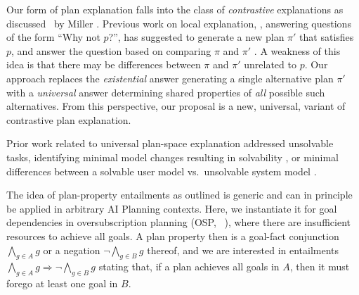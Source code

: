 Our form of plan explanation falls into the class of
\emph{contrastive} explanations as discussed \eg\ by Miller
. Previous work on local explanation, \ie,
answering questions of the form ``Why not $p$?'', has suggested to
generate a new plan $\pi'$ that satisfies $p$, and answer the question
based on comparing $\pi$ and $\pi'$
\cite{smith:aaai-12,fox:etal:ijcai-ws-17}. A weakness of this idea is
that there may be differences between $\pi$ and $\pi'$ unrelated to
$p$. Our approach replaces the \emph{existential} answer generating a
single alternative plan $\pi'$ with a \emph{universal} answer
determining shared properties of \emph{all} possible such
alternatives. From this perspective, our proposal is a new, universal,
variant of contrastive plan explanation.

Prior work related to universal plan-space explanation addressed
unsolvable tasks, identifying minimal model changes resulting in
solvability \cite{goebelbecker:etal:icaps-10}, or minimal differences
between a solvable user model vs.\ unsolvable system model
\cite{sreedharan:etal:ijcai-19}.
%
%

%


The idea of plan-property entailments as outlined is generic and can
in principle be applied in arbitrary AI Planning contexts. Here, we
instantiate it for goal dependencies in oversubscription planning
(OSP, \eg\ \cite{smith:icaps-04,domshlak:mirkis:jair-15}), where there
are insufficient resources to achieve all goals. A plan property then
is a goal-fact conjunction $\bigwedge_{g \in A} g$ or a negation $\neg
\bigwedge_{g \in B} g$ thereof, and we are interested in
 entailments $\bigwedge_{g \in A} g \Rightarrow
\neg \bigwedge_{g \in B} g$ stating that, if a plan achieves all goals
in $A$, then it must forego at least one goal in $B$.

